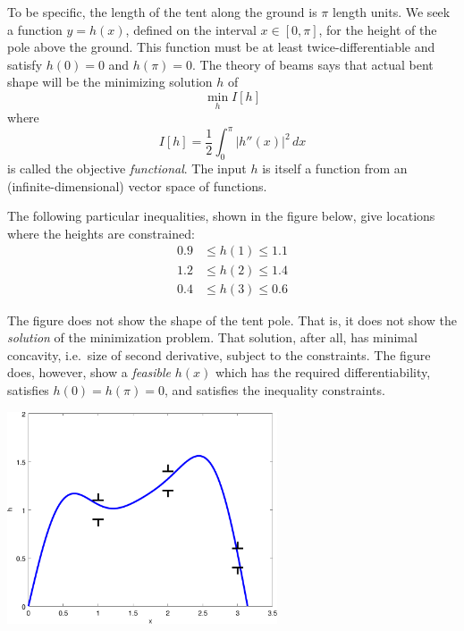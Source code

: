 \documentclass[11pt]{amsart}
\begin{document}
\begin{enumerate}
To be specific, the length of the tent along the ground is $\pi$ length units.  We seek a function $y=h(x)$, defined on the interval $x\in[0,\pi]$, for the height of the pole above the ground.  This function must be at least twice-differentiable and satisfy $h(0)=0$ and $h(\pi)=0$.  The theory of beams says that actual bent shape will be the minimizing solution $h$ of
    $$\min_h I[h]$$
where
    $$I[h] = \frac{1}{2} \int_0^\pi |h''(x)|^2\,dx$$
is called the objective \emph{functional}.  The input $h$ is itself a function from an (infinite-dimensional) vector space of functions.

The following particular inequalities, shown in the figure below, give locations where the heights are constrained:
\begin{align*}
0.9 &\le h(1) \le 1.1 \\
1.2 &\le h(2) \le 1.4 \\
0.4 &\le h(3) \le 0.6
\end{align*}

The figure does not show the shape of the tent pole.  That is, it does not show the \emph{solution} of the minimization problem.  That solution, after all, has minimal concavity, i.e.~size of second derivative, subject to the constraints.  The figure does, however, show a \emph{feasible} $h(x)$ which has the required differentiability, satisfies $h(0)=h(\pi)=0$, and satisfies the inequality constraints.

\bigskip
\begin{center}
\includegraphics[width=0.6\textwidth]{beamgates}
\end{center}

\end{enumerate}
\end{document}
